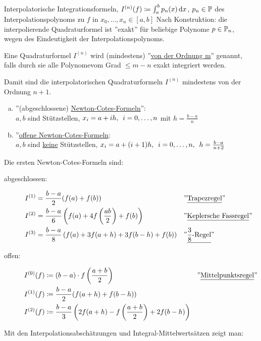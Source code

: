 \documentclass{../Skript}
\begin{document}
Interpolatorische Integrationsformeln, \(I^{(n)}
(f)\coloneqq\int^b_ap_n(x)\mathop{}\!\mathrm{d} 
x\), \( p_n\in\mathbb{P}\) des Interpolationspolynoms zu \(f\) in  
\(x_0,\dots,x_n
\in[a,b]\) Nach Konstruktion: die interpolierende Quadraturformel ist 
''exakt'' 
für beliebige Polynome \(p\in\mathbb{P}_n\), wegen des Eindeutigkeit der 
Interpolationspolynoms.
\begin{definition}
    Eine Quadraturformel \(I^{(n)}\) wird (mindestens) ''\underline{von 
    der 
    Ordnung m}'' genannt, falls durch sie alle Polynomevom Grad \(\leq 
    m-n\) 
    exakt integriert werden.
\end{definition}
Damit sind die interpolatorischen Quadraturformeln \(I^{(n)}\) 
mindestens von der 
Ordnung \(n+1\).

\begin{example}\hfill
\begin{enumerate}[(a)]
    \item ''(abgeschlossene) \underline{Newton-Cotes-Formeln}'':\\
    $a,b$ sind Stützstellen, $x_i=a+ih,\midspace \igb i 0 n$ mit 
    $h=\frac{b-a}{n}$
    \item ''\underline{offene Newton-Cotes-Formeln}:\\
    $a,b$ sind \underline{keine} Stützstellen, $x_i = a+(i+1)h,\midspace
    \igb i 0 
    n, \midspace h=\frac{b-a}{n+2}$
\end{enumerate}
Die ersten Newton-Cotes-Formeln sind:
\begin{description}
\item[abgeschlossen:]\begin{align*}
    I^{(1)} &= \frac{b-a}{2}(f(a) + f(b)) && 
    \text{''\underline{Trapezregel}''}\\
    I^{(2)} &= \frac{b-a}{6}\left(f(a) + 4f\left(\frac{ab}{2}\right) + 
    f(b)\right) && \text{''\underline{Keplersche Fassregel}''}\\
    I^{(3)} &= \frac{b-a}{8}\left(f(a) + 3f(a+h) + 3f(b-h) + f(b)\right)
    && 
    \text{''\underline{$\frac{3}{8}$-Regel}''}
\end{align*}    
\item[offen:]\begin{align*}
    I^{(0)}(f) &\coloneqq (b-a) \cdot f\left(\frac{a+b}{2}\right) && 
    \text{''\underline{Mittelpunktsregel}''}\\
    I^{(1)}(f) &\coloneqq \frac{b-a}{2}(f(a+h) + f(b-h))\\
    I^{(2)}(f) &\coloneqq \frac{b-a}{3}\left(2f(a+h) - f\left(\frac{a+b}
    {2}\right) + 2f(b-h)\right)  
\end{align*}

\end{description}
\end{example}
Mit den Interpolationsabschätzungen und Integral-Mittelwertsätzen zeigt 
man:
\end{document}
